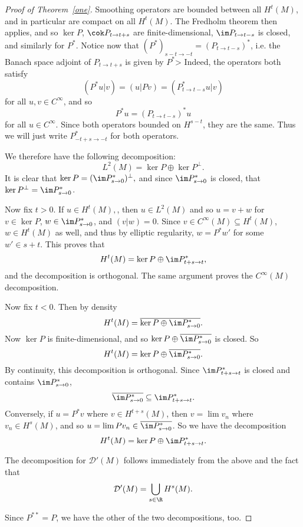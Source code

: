 \documentclass[12pt]{article}
\begin{document}
\begin{proof}[Proof of Theorem~\ref{one}]Smoothing operators are bounded between all $H^t(M)$, and in particular are compact on all $H^t(M)$. The Fredholm theorem then applies, and so $\ker P$, $\cok P_{t \to t+s}$ are finite-dimensional, $\im P_{t \to t-s}$ is closed, and similarly for $P^\ast$. Notice now that $(P^\ast)_{s-t\to -t} = (P_{t \to t-s})^\ast$, i.e. the Banach space adjoint of $P_{t \to t+s}$ is given by $P^\ast$> Indeed, the operators both satisfy
\[(P^\ast u|v) = (u|Pv) = (P_{t \to t-s}^\ast u|v)\] for all $u,v \in C^\infty$, and so
\[P^\ast u = (P_{t \to t-s})^\ast u\] for all $u \in C^\infty$. Since both operators bounded on $H^{s-t}$, they are the same. Thus we will just write $P^\ast_{-t+s\to-t}$ for both operators.

We therefore have the following decomposition:
\[L^2(M) = \ker P \oplus  \ker P^\bot.\] It is clear that $\ker P = (\im P^\ast_{s \to 0})^\bot,$ and since $\im P^\ast_{s \to 0}$ is closed, that $\ker P^\bot = \im P^\ast_{s \to 0}$. 

Now fix $t > 0$. If $u \in H^t(M),$, then $u \in L^2(M)$ and so $u = v + w$ for $v \in \ker P$, $w \in \im P^\ast_{s\to 0}$, and $(v|w) = 0$. Since $v \in C^\infty(M) \subseteq H^t(M)$, $w \in H^t(M)$ as well, and thus by elliptic regularity, $w = P^\ast w'$ for some $w' \in s+t$. This proves that
\[H^t(M) = \ker P \oplus \im P^\ast_{t+s\to t},\] and the decomposition is orthogonal. The same argument proves the $C^\infty(M)$ decomposition.

Now fix $t < 0$. Then by density
\[H^t(M) = \overline{\ker P \oplus \im P^\ast_{s\to 0}}.\] Now $\ker P$ is finite-dimensional, and so $\ker P \oplus\overline{ \im P^\ast_{s\to 0}}$ is closed. So
\[H^t(M) = \ker P \oplus\overline{\im P^\ast_{s\to 0}}.\] By continuity, this decomposition is orthogonal. Since $\im P^\ast_{t+s\to t}$ is closed and contains $\im P^\ast_{s \to 0}$,
\[\overline{\im P^\ast_{s\to 0}} \subseteq \im P^\ast_{t+s\to t}.\] Conversely, if $u = P^\ast v$ where $v \in H^{t+s}(M)$, then $v = \lim v_n$ where $v_n \in H^{s}(M)$, and so $u = \lim Pv_n \in \overline{\im P^\ast_{s\to 0}}$. So we have the decomposition
\[H^t(M) = \ker P \oplus \im P^\ast_{t+s\to t}.\]

The decomposition for $\mathcal D'(M)$ follows immediately from the above and the fact that
\[\mathcal D'(M) = \bigcup_{s \in \R} H^s(M).\]

Since $P^{\ast\ast} = P$, we have the other of the two decompositions, too.


\end{proof}
\end{document}
